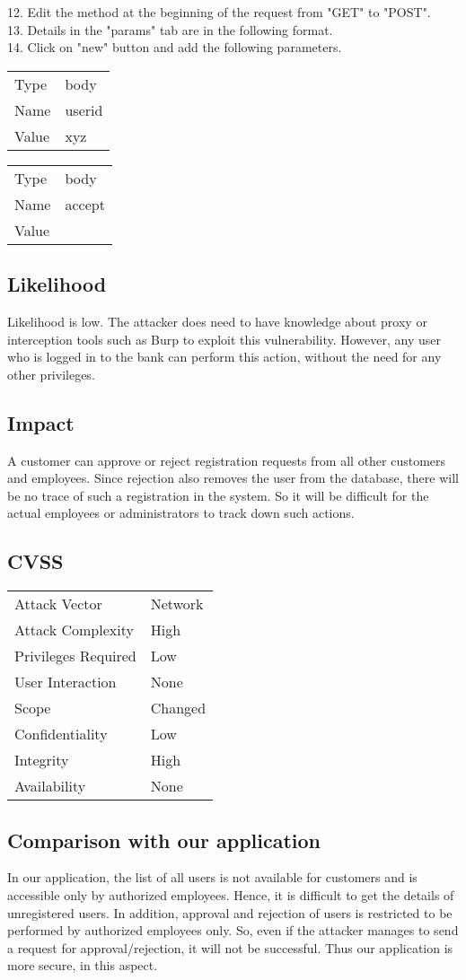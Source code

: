 12. Edit the method at the beginning of the request from "GET" to "POST". \\
13. Details in the "params" tab are in the following format. \\
14. Click on "new" button and add the following parameters. \\
\begin{tabular}{l | l}
Type		& body \\
Name		& userid \\
Value 		& xyz
\end{tabular}
\begin{tabular}{l | l}
Type		& body \\
Name		& accept \\
Value 		& 
\end{tabular}

\subsection{Likelihood}
Likelihood is low.
The attacker does need to have knowledge about proxy or interception tools such as Burp to exploit this vulnerability. However, any user who is logged in to the bank can perform this action, without the need for any other privileges.

\subsection{Impact}
A customer can approve or reject registration requests from all other customers and employees. Since rejection also removes the user from the database, there will be no trace of such a registration in the system. So it will be difficult for the actual employees or administrators to track down such actions.

\subsection{CVSS}
\begin{tabular}{l | l}
Attack Vector		& Network \\
Attack Complexity	& High \\
Privileges Required & Low \\
User Interaction	& None \\
Scope				& Changed \\
Confidentiality		& Low \\
Integrity			& High \\
Availability		& None
\end{tabular}

\subsection{Comparison with our application}
In our application, the list of all users is not available for customers and is accessible only by authorized employees. Hence, it is difficult to get the details of unregistered users. In addition, approval and rejection of users is restricted to be performed by authorized employees only. So, even if the attacker manages to send a request for approval/rejection, it will not be successful. Thus our application is more secure, in this aspect.
\clearpage